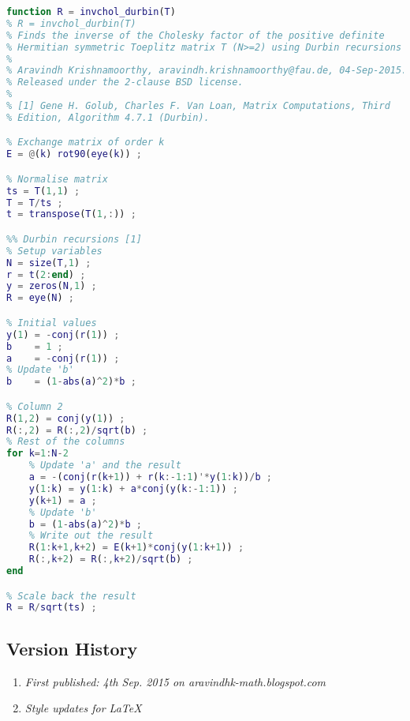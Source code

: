 \begin{lstlisting}[language=MATLAB,numbers=none]
function R = invchol_durbin(T)
% R = invchol_durbin(T)
% Finds the inverse of the Cholesky factor of the positive definite
% Hermitian symmetric Toeplitz matrix T (N>=2) using Durbin recursions [1].
%
% Aravindh Krishnamoorthy, aravindh.krishnamoorthy@fau.de, 04-Sep-2015.
% Released under the 2-clause BSD license.
%
% [1] Gene H. Golub, Charles F. Van Loan, Matrix Computations, Third
% Edition, Algorithm 4.7.1 (Durbin).

% Exchange matrix of order k
E = @(k) rot90(eye(k)) ;

% Normalise matrix
ts = T(1,1) ;
T = T/ts ;
t = transpose(T(1,:)) ;

%% Durbin recursions [1]
% Setup variables
N = size(T,1) ;
r = t(2:end) ;
y = zeros(N,1) ;
R = eye(N) ;

% Initial values
y(1) = -conj(r(1)) ;
b    = 1 ;
a    = -conj(r(1)) ;
% Update 'b'
b    = (1-abs(a)^2)*b ;

% Column 2
R(1,2) = conj(y(1)) ;
R(:,2) = R(:,2)/sqrt(b) ;
% Rest of the columns
for k=1:N-2
	% Update 'a' and the result
	a = -(conj(r(k+1)) + r(k:-1:1)'*y(1:k))/b ;
	y(1:k) = y(1:k) + a*conj(y(k:-1:1)) ;
	y(k+1) = a ;
	% Update 'b'
	b = (1-abs(a)^2)*b ;
	% Write out the result
	R(1:k+1,k+2) = E(k+1)*conj(y(1:k+1)) ;
	R(:,k+2) = R(:,k+2)/sqrt(b) ;
end

% Scale back the result
R = R/sqrt(ts) ;
\end{lstlisting}

\subsection{Version History}
\begin{enumerate}
	\item \emph{First published: 4th Sep. 2015 on aravindhk-math.blogspot.com}
	\item \emph{Style updates for \LaTeX}
\end{enumerate}
